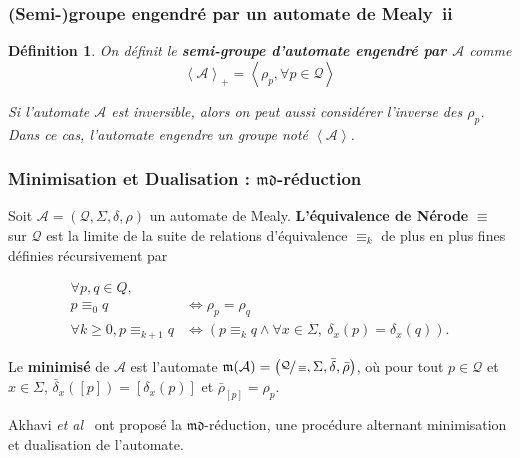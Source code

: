 \documentclass[11pt]{beamer}
\newtheorem{defi}{Définition}
\begin{document}
\begin{frame}
  \frametitle{(Semi-)groupe engendré par un automate de Mealy~ii}

  \begin{defi}
    On définit le \textbf{semi-groupe d'automate engendré par $\mathcal{A}$} comme
    \begin{equation*}
      \left<\mathcal{A}\right>_+=\left<\rho_p, \forall p\in\mathcal{Q}\right>
    \end{equation*}

    Si l'automate $\mathcal{A}$ est inversible, alors on peut aussi considérer l'inverse des $\rho_p$. Dans ce cas, l'automate engendre un groupe noté $\left<\mathcal{A}\right>$.

  \end{defi}
\end{frame}

\begin{frame}
  \frametitle{Minimisation et Dualisation : $\mathfrak{md}$-réduction}

    \begin{definition}
        Soit $\mathcal{A}=\left(\mathcal{Q}, \Sigma, \delta, \rho\right)$ un automate de Mealy. \textbf{L'équivalence de Nérode} $\equiv$ sur $\mathcal{Q}$ est la limite de la suite de relations d'équivalence $\equiv_k$ de plus en plus fines définies récursivement par

        \begin{align*}
        \forall p, q \in Q,\\
        p \equiv_0 q &\iff \rho_p = \rho_q \\
        \forall k \geq 0, p \equiv_{k+1}q &\iff \left(p\equiv_kq \wedge \forall x \in \Sigma,~\delta_x(p)=\delta_x(q)\right).
        \end{align*}

        Le \textbf{minimisé} de $\mathcal{A}$ est l'automate $\mathfrak{m}(\mathcal{A})=\left(\sfrac{\mathcal{Q}}{\equiv}, \Sigma, \bar{\delta}, \bar{\rho}\right)$, où pour tout $p\in\mathcal{Q}$ et $x\in\Sigma$, $\bar{\delta}_x([p]) = [\delta_x(p)]$ et $\bar{\rho}_{[p]} =  \rho_p$.
    \end{definition}

    Akhavi \emph{et al}~\cite{DBLP:journals/corr/abs-1105-4725} ont proposé la $\mathfrak{md}$-réduction, une procédure alternant minimisation et dualisation de l'automate.
\end{frame}
\end{document}
